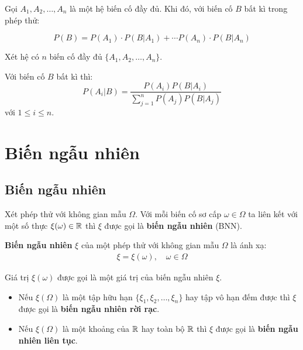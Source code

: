 \begin{theorem}
    Gọi $A_1, A_2, \ldots, A_n$ là một hệ biến cố đầy đủ. Khi đó, với biến cố $B$ bất kì trong phép thử: 
    
    \begin{equation}    
        P(B) = P(A_1) \cdot P(B | A_1) + \cdots P(A_n) \cdot P(B | A_n)
    \end{equation}
\end{theorem}

\begin{theorem}
    Xét hệ có $n$ biến cố đầy đủ $\{ A_1, A_2, \ldots, A_n \}$. 
    
    Với biến cố $B$ bất kì thì: \[P(A_i | B) = \frac{P(A_i) P(B | A_i)}{\displaystyle{\sum_{j=1}^n P(A_j) P(B | A_j)}}\] với $1 \leq i \leq n$.
\end{theorem}

\chapter{Biến ngẫu nhiên}

\section{Biến ngẫu nhiên}

Xét phép thử với không gian mẫu $\Omega$. Với mỗi biến cố sơ cấp $\omega \in \Omega$ ta liên kết với một số thực $\xi(\omega) \in \mathbb{R}$ thì $\xi$ được gọi là \textbf{biến ngẫu nhiên} (BNN).

\begin{definition}
    \textbf{Biến ngẫu nhiên} $\xi$ của một phép thử với không gian mẫu $\Omega$ là ánh xạ: 
    \begin{equation*}
        \begin{split}
            \xi = \xi (\omega), \quad \omega \in \Omega
        \end{split}
    \end{equation*}
\end{definition}
    
Giá trị $\xi(\omega)$ được gọi là một giá trị của biến ngẫu nhiên $\xi$.

\begin{itemize}
    \item Nếu $\xi(\Omega)$ là một tập hữu hạn $\{\xi_1, \xi_2, \ldots,\xi_n\}$ hay tập vô hạn đếm được thì $\xi$ được gọi là \textbf{biến ngẫu nhiên rời rạc}.
    \item Nếu $\xi(\Omega)$ là một khoảng của $\mathbb{R}$ hay toàn bộ $\mathbb{R}$ thì $\xi$ được gọi là \textbf{biến ngẫu nhiên liên tục}.
\end{itemize}

